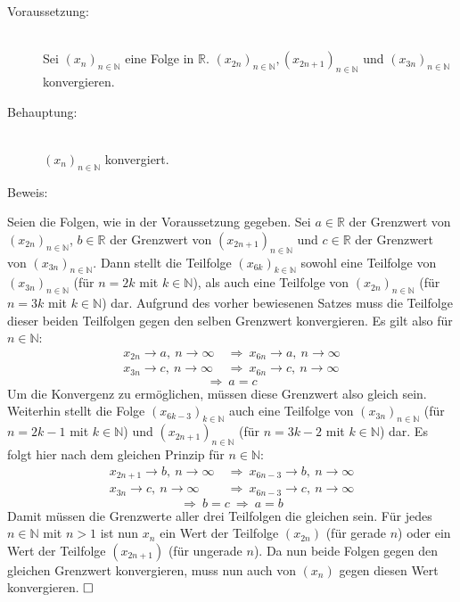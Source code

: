 \documentclass[10pt, a4paper]{article}
\begin{document}
			\begin{description}
				\item[Voraussetzung:] \hfill \\
					Sei $(x_n)_{n\in \mathbb{N}}$ eine Folge in $\mathbb{R}$. $(x_{2n})_{n\in \mathbb{N}},(x_{2n+1})_{n\in \mathbb{N}}$ und $(x_{3n})_{n\in \mathbb{N}}$ konvergieren. 
				\item[Behauptung:] \hfill \\
					$(x_n)_{n\in \mathbb{N}}$ konvergiert.
				\item[Beweis:]
			\end{description}
			
			Seien die Folgen, wie in der Voraussetzung gegeben. Sei $a\in \mathbb{R}$ der Grenzwert von $(x_{2n})_{n\in \mathbb{N}}$, $b\in \mathbb{R}$ der Grenzwert von $(x_{2n+1})_{n\in \mathbb{N}}$ und $c \in \mathbb{R}$ der Grenzwert von $(x_{3n})_{n\in \mathbb{N}}$. Dann stellt die Teilfolge $(x_{6k})_{k\in \mathbb{N}}$ sowohl eine Teilfolge von $(x_{3n})_{n\in \mathbb{N}}$ (für $n=2k$ mit $k \in \mathbb{N}$), als auch eine Teilfolge von $(x_{2n})_{n\in \mathbb{N}}$ (für $n=3k$ mit $k \in \mathbb{N}$) dar. Aufgrund des vorher bewiesenen Satzes muss die Teilfolge dieser beiden Teilfolgen gegen den selben Grenzwert konvergieren. Es gilt also für $n \in \mathbb{N}$:
			\begin{align*}
				x_{2n} \longrightarrow a,\ n\longrightarrow \infty \ &\Rightarrow \  x_{6n} \longrightarrow a, \ n\longrightarrow \infty \\
				x_{3n} \longrightarrow c,\ n\longrightarrow \infty \ &\Rightarrow \  x_{6n} \longrightarrow c, \ n\longrightarrow \infty 
			\end{align*}
			\[
				\Rightarrow \ a = c
			\]
			Um die Konvergenz zu ermöglichen, müssen diese Grenzwert also gleich sein. Weiterhin stellt die Folge $(x_{6k-3})_{k\in \mathbb{N}}$ auch eine Teilfolge von $(x_{3n})_{n\in \mathbb{N}}$ (für $n=2k-1$ mit $k \in \mathbb{N}$) und $(x_{2n+1})_{n\in \mathbb{N}}$ (für $n = 3k-2$ mit $k\in \mathbb{N}$) dar. Es folgt hier nach dem gleichen Prinzip für $n \in \mathbb{N}$:
			\begin{align*}
				x_{2n+1} \longrightarrow b,\ n\longrightarrow \infty \ &\Rightarrow \  x_{6n-3} \longrightarrow b, \ n\longrightarrow \infty \\
				x_{3n} \longrightarrow c,\ n\longrightarrow \infty \ &\Rightarrow \  x_{6n-3} \longrightarrow c, \ n\longrightarrow \infty 
			\end{align*}
			\[
				\Rightarrow \ b = c \ \Rightarrow \ a = b
			\]
			Damit müssen die Grenzwerte aller drei Teilfolgen die gleichen sein. Für jedes $n \in \mathbb{N}$ mit $n>1$ ist nun $x_n$ ein Wert der Teilfolge $(x_{2n})$ (für gerade $n$) oder ein Wert der Teilfolge $(x_{2n+1})$ (für ungerade $n$). Da nun beide Folgen gegen den gleichen Grenzwert konvergieren, muss nun auch von $(x_n)$ gegen diesen Wert konvergieren. $\hfill\Box$
			
\end{document}

